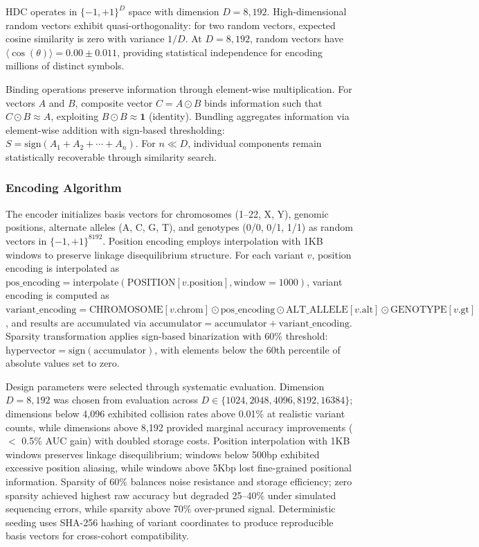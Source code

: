 \documentclass[11pt,letterpaper]{article}
\begin{document}
HDC operates in $\{-1,+1\}^D$ space with dimension $D = 8,192$. High-dimensional random vectors exhibit quasi-orthogonality: for two random vectors, expected cosine similarity is zero with variance $1/D$. At $D = 8,192$, random vectors have $\langle\cos(\theta)\rangle = 0.00 \pm 0.011$, providing statistical independence for encoding millions of distinct symbols.

Binding operations preserve information through element-wise multiplication. For vectors $A$ and $B$, composite vector $C = A \odot B$ binds information such that $C \odot B \approx A$, exploiting $B \odot B \approx \mathbf{1}$ (identity). Bundling aggregates information via element-wise addition with sign-based thresholding: $S = \text{sign}(A_1 + A_2 + \cdots + A_n)$. For $n \ll D$, individual components remain statistically recoverable through similarity search.

\subsubsection{Encoding Algorithm}

The encoder initializes basis vectors for chromosomes (1--22, X, Y), genomic positions, alternate alleles (A, C, G, T), and genotypes (0/0, 0/1, 1/1) as random vectors in $\{-1,+1\}^{8192}$. Position encoding employs interpolation with 1KB windows to preserve linkage disequilibrium structure. For each variant $v$, position encoding is interpolated as $\text{pos\_encoding} = \text{interpolate}(\text{POSITION}[v.\text{position}], \text{window}=1000)$, variant encoding is computed as $\text{variant\_encoding} = \text{CHROMOSOME}[v.\text{chrom}] \odot \text{pos\_encoding} \odot \text{ALT\_ALLELE}[v.\text{alt}] \odot \text{GENOTYPE}[v.\text{gt}]$, and results are accumulated via $\text{accumulator} = \text{accumulator} + \text{variant\_encoding}$. Sparsity transformation applies sign-based binarization with 60\% threshold: $\text{hypervector} = \text{sign}(\text{accumulator})$, with elements below the 60th percentile of absolute values set to zero.

Design parameters were selected through systematic evaluation. Dimension $D = 8,192$ was chosen from evaluation across $D \in \{1024, 2048, 4096, 8192, 16384\}$; dimensions below 4,096 exhibited collision rates above 0.01\% at realistic variant counts, while dimensions above 8,192 provided marginal accuracy improvements ($<$ 0.5\% AUC gain) with doubled storage costs. Position interpolation with 1KB windows preserves linkage disequilibrium; windows below 500bp exhibited excessive position aliasing, while windows above 5Kbp lost fine-grained positional information. Sparsity of 60\% balances noise resistance and storage efficiency; zero sparsity achieved highest raw accuracy but degraded 25--40\% under simulated sequencing errors, while sparsity above 70\% over-pruned signal. Deterministic seeding uses SHA-256 hashing of variant coordinates to produce reproducible basis vectors for cross-cohort compatibility.
\end{document}
